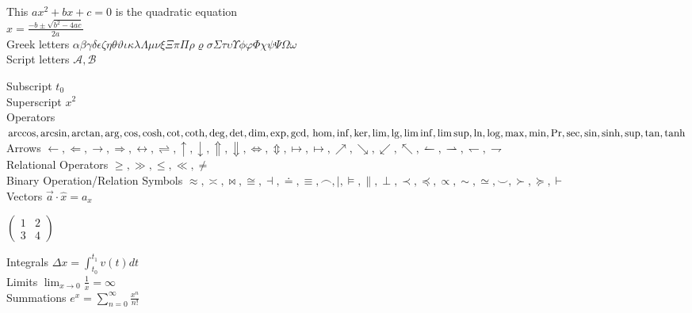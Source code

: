 \documentclass[a4paper,12pt]{book}
\begin{document}
This \( ax^2 + bx + c = 0 \) is the quadratic equation \\

$x=\frac{-b\pm\sqrt{b^2-4ac}}{2a}$ \\

Greek letters $\alpha \beta \gamma \delta \epsilon \zeta \eta \theta \vartheta \iota \kappa \lambda \Lambda \mu \nu \xi \Xi \pi \Pi \rho \varrho \sigma \Sigma \tau \upsilon \Upsilon \phi \varphi \Phi \chi \psi \Psi \Omega \omega $ \\

Script letters $\mathcal{A}, \mathcal{B}$

Subscript $t_0$ \\

Superscript $x^2$ \\

Operators $\arccos, \arcsin, \arctan, \arg, \cos, \cosh, \cot, \coth, \deg,
\det, \dim, \exp, \gcd,\\ \hom, \inf, \ker, \lim, \lg, \liminf, \limsup, \ln, \log,
\max, \min, \Pr, \sec, \sin, \sinh, \sup, \tan, \tanh$ \\

Arrows $\leftarrow, \Leftarrow, \rightarrow, \Rightarrow, \leftrightarrow, \rightleftharpoons,
\uparrow, \downarrow, \Uparrow, \Downarrow, \Leftrightarrow, \Updownarrow, \mapsto, \longmapsto,
\nearrow, \searrow, \swarrow, \nwarrow, \leftharpoonup, \rightharpoonup, \leftharpoondown, \rightharpoondown$ \\

Relational Operators $ \geq, \gg, \leq, \ll, \neq $ \\

Binary Operation/Relation Symbols $ \approx, \asymp, \bowtie, \cong, \dashv, \doteq,
\equiv, \frown, \mid, \models, \parallel, \perp, \prec, \preceq, \propto, \sim, \simeq, \smile,
\succ, \succeq, \vdash $ \\

Vectors $\vec{a}\cdot\hat{x}=a_x$

$\begin{pmatrix}
    1 & 2 \\
    3 & 4
\end{pmatrix}$

Integrals $\Delta x=\int_{t_0}^{t_1}v(t)dt$ \\

Limits $\lim_{x\to0}\frac 1 x = \infty$ \\

Summations $e^x=\sum_{n=0}^\infty\frac{x^n}{n!}$ \\
\end{document}
